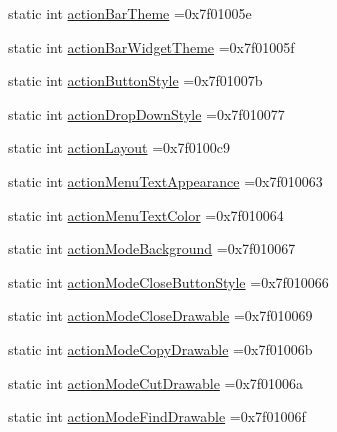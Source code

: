 \begin{DoxyCompactItemize}
\item 
static int \hyperlink{classandroid_1_1support_1_1v7_1_1appcompat_1_1R_1_1attr_a09e7f5fd84af8514b716aff933df644c}{action\+Bar\+Theme} =0x7f01005e
\item 
static int \hyperlink{classandroid_1_1support_1_1v7_1_1appcompat_1_1R_1_1attr_ac2e72d8d18bc18b83707e4b81ad11060}{action\+Bar\+Widget\+Theme} =0x7f01005f
\item 
static int \hyperlink{classandroid_1_1support_1_1v7_1_1appcompat_1_1R_1_1attr_a3a9c65c5f489ade11715a890bcb6817d}{action\+Button\+Style} =0x7f01007b
\item 
static int \hyperlink{classandroid_1_1support_1_1v7_1_1appcompat_1_1R_1_1attr_ad8381a94ffd2505e02cb8ebd52e55328}{action\+Drop\+Down\+Style} =0x7f010077
\item 
static int \hyperlink{classandroid_1_1support_1_1v7_1_1appcompat_1_1R_1_1attr_ad39ae936831dd32921fd3588f0a5150b}{action\+Layout} =0x7f0100c9
\item 
static int \hyperlink{classandroid_1_1support_1_1v7_1_1appcompat_1_1R_1_1attr_a471d001a1c418b85dcaf54b0d910b842}{action\+Menu\+Text\+Appearance} =0x7f010063
\item 
static int \hyperlink{classandroid_1_1support_1_1v7_1_1appcompat_1_1R_1_1attr_a9ac5cc329fd14ece75b0ee49b520bbb5}{action\+Menu\+Text\+Color} =0x7f010064
\item 
static int \hyperlink{classandroid_1_1support_1_1v7_1_1appcompat_1_1R_1_1attr_ae72385f347b4f74aea4d77340a4ab5a4}{action\+Mode\+Background} =0x7f010067
\item 
static int \hyperlink{classandroid_1_1support_1_1v7_1_1appcompat_1_1R_1_1attr_a67dbe021038d6f18acd2b888552074ac}{action\+Mode\+Close\+Button\+Style} =0x7f010066
\item 
static int \hyperlink{classandroid_1_1support_1_1v7_1_1appcompat_1_1R_1_1attr_a02eb886de7c9d0c93fe17338af168f46}{action\+Mode\+Close\+Drawable} =0x7f010069
\item 
static int \hyperlink{classandroid_1_1support_1_1v7_1_1appcompat_1_1R_1_1attr_ae03dbdfc7235f1d244357a9d8a548519}{action\+Mode\+Copy\+Drawable} =0x7f01006b
\item 
static int \hyperlink{classandroid_1_1support_1_1v7_1_1appcompat_1_1R_1_1attr_a06308791b23bb0dfb5c10b607c6fb008}{action\+Mode\+Cut\+Drawable} =0x7f01006a
\item 
static int \hyperlink{classandroid_1_1support_1_1v7_1_1appcompat_1_1R_1_1attr_a7328edaaa32233c007eaf09fb8ae5524}{action\+Mode\+Find\+Drawable} =0x7f01006f
\item 

\end{DoxyCompactItemize}
